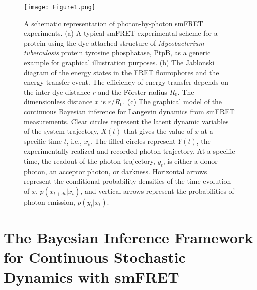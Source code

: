 \documentclass[journal=jpcbfk,manuscript=article,layout=twocolumn,articletitle=true]{achemso}
\begin{document}
\begin{figure}[ht]
\centering
\texttt{[image: Figure1.png]}
\caption[A schematic representation of smFRET experiments]{\label{fig:FRETdiagram} A schematic representation of photon-by-photon smFRET experiments. (a) A typical smFRET experimental scheme for a protein using the dye-attached structure of {\it Mycobacterium tuberculosis} protein tyrosine phosphatase, PtpB\cite{Flynn:2010jpa}, as a generic example for graphical illustration purposes. (b) The Jablonski diagram of the energy states in the FRET flourophores and the energy transfer event. The efficiency of energy transfer depends on the inter-dye distance $r$ and the F\"{o}rster radius $R_0$. The dimensionless distance $x$ is $r/R_0$. (c) The graphical model of the continuous Bayesian inference for Langevin dynamics from smFRET measurements. Clear circles represent the latent dynamic variables of the system trajectory, $X(t)$ that gives the value of $x$ at a specific time $t$, i.e., $x_t$. The filled circles represent $Y(t)$, the experimentally realized and recorded photon trajectory. At a specific time, the readout of the photon trajectory, $y_t$, is either a donor photon, an acceptor photon, or darkness. Horizontal arrows represent the conditional probability densities of the time evolution of $x$, $p(x_{t + d t} | x_t)$, and vertical arrows represent the probabilities of photon emission, $p(y_t | x_t)$.}
\end{figure}

\section{The Bayesian Inference Framework for Continuous Stochastic Dynamics with smFRET}
\end{document}
